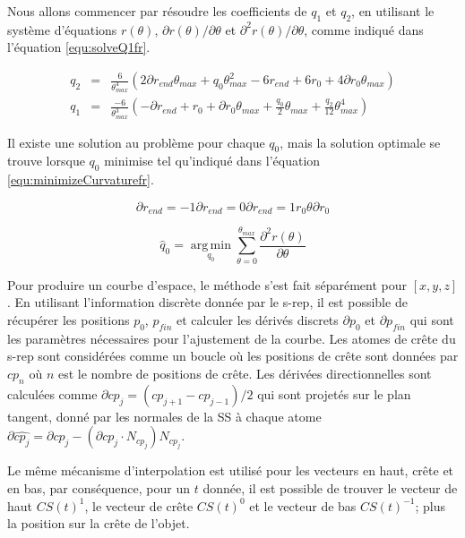 Nous allons commencer par résoudre les coefficients de $q_1$ et $q_2$,
en utilisant le système d'équations $r(\theta)$, $\partial r(\theta)/\partial \theta$ et $\partial^2 r(\theta)/\partial \theta$, 
comme indiqué dans l'équation \ref{equ:solveQ1fr}.

\begin{eqnarray} 
q_2 &=& \frac{6}{\theta_{max}^4} (2 \partial r_{end} \theta_{max} + q_0 \theta_{max}^2 - 6 r_{end} + 6 r_0 + 4 \partial r_0 \theta_{max}) \\
q_1 &=& \frac{-6}{\theta_{max}^3} (-\partial r_{end} + r_0 + \partial r_0 \theta_{max} +  \frac{q_0}{2} \theta_{max} + \frac{q_2}{12} \theta_{max}^4)
\label{equ:solveQ1fr}
\end{eqnarray} 

Il existe une solution au problème pour chaque $q_0$, mais
la solution optimale se trouve lorsque $q_0$ minimise 
tel qu'indiqué dans l'équation \ref{equ:minimizeCurvaturefr}.

\begin{equation}
 \partial r_{end} =  -1 \partial r_{end} = 0 \partial r_{end} = 1 r_0 \theta \partial r_0
\end{equation}

\begin{equation}  
  \hat q_0 = \operatorname*{arg\,min}_{q_0} \sum_{\theta = 0}^{\theta_{max}} \frac{\partial^2 r(\theta)}{\partial \theta}
  \label{equ:minimizeCurvaturefr}
\end{equation}

Pour produire un courbe d'espace, le méthode s'est fait séparément pour $[x, y, z]$.
En utilisant l'information discrète donnée par le s-rep,
il est possible de récupérer les positions $p_0$, $p_{fin}$ et calculer les dérivés discrets $\partial p_0$ et $\partial p_{fin} $
qui sont les paramètres nécessaires pour l'ajustement de la courbe.
Les atomes de crête du s-rep sont considérées comme un boucle
où les positions de crête sont données par $cp_n$ où $n$ est le nombre de positions de crête.
Les dérivées directionnelles sont calculées comme $\partial cp_j = (cp_{j + 1} - cp_{j - 1}) / 2$
qui sont projetés sur le plan tangent, donné par les normales de la SS à chaque atome
$\partial \hat {cp_j} = \partial cp_j - (\partial cp_j \cdot N_ {cp_j}) N_ {cp_j} $.

Le même mécanisme d'interpolation est utilisé pour les vecteurs en haut, crête et en bas,
par conséquence, pour un $t$ donnée,
il est possible de trouver le vecteur de haut $CS(t)^1$, le vecteur de crête $CS(t)^0$ et le vecteur de bas $CS(t)^{-1}$;
plus la position sur la crête de l'objet.

